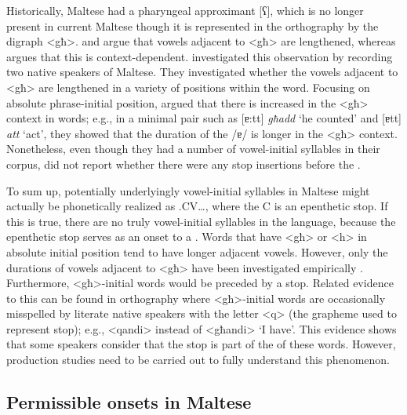 \documentclass[output=paper]{langsci/langscibook}
\begin{document}
Historically, Maltese had a  pharyngeal approximant [ʕ], which is no longer present in current Maltese though it is represented in the orthography by the digraph <għ>. \citet{borg1997maltese} and \citet{brame1972abstractness} argue that vowels adjacent to  <għ> are lengthened, whereas \citet{puech1979parlers} argues that this  is context-dependent. \citet{hume2009vowel} investigated this observation by recording two native speakers of Maltese. They investigated whether the vowels adjacent to <għ> are lengthened in a variety of positions within the word. Focusing on absolute phrase-initial position, \citet{hume2009vowel} argued that there is increased  in the <għ> context in  words; e.g., in a minimal pair such as [ɐ:tt] \textit{għadd} ‘he counted’ and [ɐtt] \textit{att} ‘act’, they showed that the duration of the  /ɐ/ is longer in the <għ> context. Nonetheless, even though they had a number of vowel-initial syllables in their corpus, \citet{hume2009vowel} did not report whether there were any  stop insertions before the . 

To sum up, potentially underlyingly vowel-initial syllables in Maltese might actually be phonetically realized as .CV…, where the C is an epenthetic  stop. If this is true, there are no truly vowel-initial syllables in the language, because the epenthetic  stop serves as an onset to a . Words that have  <għ> or <h> in absolute initial position tend to have longer adjacent vowels. However, only the durations of vowels adjacent to <għ> have been investigated empirically \citep{hume2009vowel}. Furthermore, <għ>-initial words would be preceded by a  stop. Related evidence to this can be found in orthography where <għ>-initial words are occasionally misspelled by literate native speakers with the letter <q> (the grapheme used to represent  stop); e.g., <qandi> instead of <għandi> ‘I have’. This evidence shows that some speakers consider that the  stop is part of the  of these words. However, production studies need to be carried out to fully understand this phenomenon. 


\subsection{Permissible onsets in Maltese}
\end{document}
